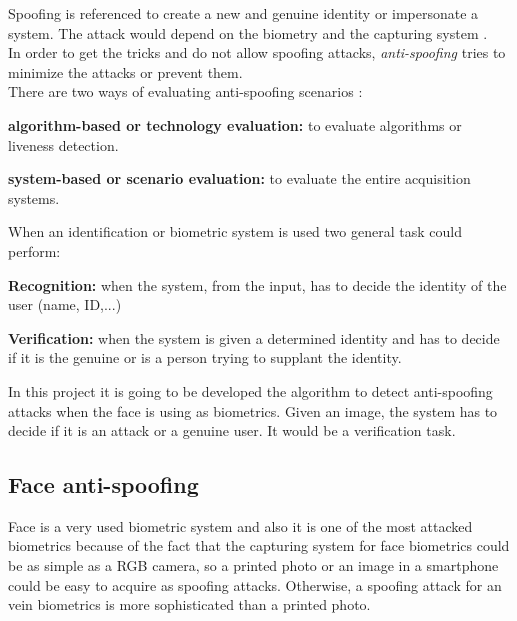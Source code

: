 Spoofing is referenced to create a new and genuine identity or impersonate a system. The attack would depend on the biometry and the capturing system \cite{Spoofing_survey}.\\

In order to get the tricks and do not allow spoofing attacks, \textit{anti-spoofing} tries to minimize the attacks or prevent them.\\ 

There are two ways of evaluating anti-spoofing scenarios \cite{Spoofing_survey}: 
\begin{description}[noitemsep,topsep=8pt,parsep=0pt,partopsep=20pt]
\item \textbf{algorithm-based or technology evaluation:} to evaluate algorithms or liveness detection.
\item \textbf{system-based or scenario evaluation:} to evaluate the entire acquisition systems.
\end{description}

When an identification or biometric system is used two general task could perform:
\begin{description}[noitemsep,topsep=8pt,parsep=0pt,partopsep=20pt]
\item \textbf{Recognition:} when the system, from the input, has to decide the identity of the user (name, ID,...) 
\item \textbf{Verification:} when the system is given a determined identity and has to decide if it is the genuine or is a person trying to supplant the identity.
\end{description}

In this project it is going to be developed the algorithm to detect anti-spoofing attacks when the face is using as biometrics. Given an image, the system has to decide if it is an attack or a genuine user. It would be a verification task.\\

\subsection{Face anti-spoofing}
Face is a very used biometric system and also it is one of the most attacked biometrics because of the fact that the capturing system for face biometrics could be as simple as a RGB camera, so a printed photo or an image in a smartphone could be easy to acquire as spoofing attacks. Otherwise, a spoofing attack for an vein biometrics is more sophisticated than a printed photo.\\

